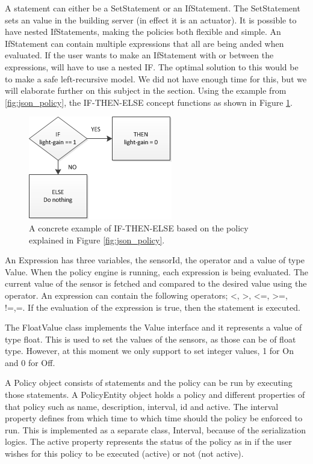 A statement can either be a SetStatement or an IfStatement. The SetStatement sets an value in the building server (in effect it is an actuator). It is possible to have nested IfStatements, making the policies both flexible and simple. An IfStatement can contain multiple expressions that all are being anded when evaluated. If the user wants to make an IfStatement with or between the expressions, will have to use a nested IF. The optimal solution to this would be to make a safe left-recursive model. We did not have enough time for this, but we will elaborate further on this subject in the  section. 
Using the example from \ref{fig:json_policy}, the IF-THEN-ELSE concept functions as shown in Figure \ref{fig:if-then-else_example}.
\begin{figure}
	\centering
    \includegraphics[scale=0.55]{images/IF-THEN-ELSE_example.png} 
	\caption{A concrete example of IF-THEN-ELSE based on the policy explained in Figure \ref{fig:json_policy}.}
	\label{fig:if-then-else_example}
\end{figure}

An Expression has three variables, the sensorId, the operator and a value of type Value. When the policy engine is running, each expression is being evaluated. The current value of the sensor is fetched and compared to the desired value using the operator. An expression can contain the following operators; <, >, <=, >=, !=,=. 
If the evaluation of the expression is true, then the statement is executed.

The FloatValue class implements the Value interface and it represents a value of type float. This is used to set the values of the sensors, as those can be of float type. However, at this moment we only support to set integer values, 1 for On and 0 for Off.

A Policy object consists of statements and the policy can be run by executing those statements. A PolicyEntity object holds a policy and different properties of that policy such as name, description, interval, id and active. The interval property defines from which time to which time should the policy be enforced to run. This is implemented as a separate class, Interval, because of the serialization logics.  The active property represents the status of the policy as in if the user wishes for this policy to be executed (active) or not (not active).

